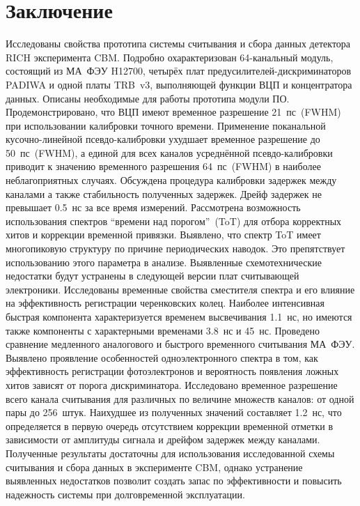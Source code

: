 \section*{Заключение}\label{sec:secSummary}

Исследованы свойства прототипа системы считывания и сбора данных детектора RICH эксперимента CBM. Подробно охарактеризован 64-канальный модуль, состоящий из МА~ФЭУ H12700, четырёх плат предусилителей-дискриминаторов PADIWA и одной платы TRB~v3, выполняющей функции ВЦП и концентратора данных. Описаны необходимые для работы прототипа модули ПО. Продемонстрировано, что ВЦП имеют временное разрешение 21~пс~(FWHM) при использовании калибровки точного времени. Применение поканальной кусочно-линейной псевдо-калибровки ухудшает временное разрешение до 50~пс~(FWHM), а единой для всех каналов усреднённой псевдо-калибровки приводит к значению временного разрешения 64~пс~(FWHM) в наиболее неблагоприятных случаях. Обсуждена процедура калибровки задержек между каналами а также стабильность полученных задержек. Дрейф задержек не превышает 0.5~нс за все время измерений.
Рассмотрена возможность использования спектров ``времени над порогом''~(ToT) для отбора корректных хитов и коррекции временной привязки. Выявлено, что спектр ToT имеет многопиковую структуру по причине периодических наводок. Это препятствует использованию этого параметра в анализе. Выявленные схемотехнические недостатки будут устранены в следующей версии плат считывающей электроники. Исследованы временные свойства сместителя спектра и его влияние на эффективность регистрации черенковских колец. Наиболее интенсивная быстрая компонента характеризуется временем высвечивания 1.1~нс, но имеются также компоненты с характерными временами 3.8~нс и 45~нс. Проведено сравнение медленного аналогового и быстрого временного считывания МА~ФЭУ. Выявлено проявление особенностей одноэлектронного спектра в том, как эффективность регистрации фотоэлектронов и вероятность появления ложных хитов зависят от порога дискриминатора. Исследовано временное разрешение всего канала считывания для различных по величине множеств каналов: от одной пары до 256~штук. Наихудшее из полученных значений составляет 1.2~нс, что определяется в первую очередь отсутствием коррекции временной отметки в зависимости от амплитуды сигнала и дрейфом задержек между каналами. Полученные результаты достаточны для использования исследованной схемы считывания и сбора данных в эксперименте CBM, однако устранение выявленных недостатков позволит создать запас по эффективности и повысить надежность системы при долговременной эксплуатации.
